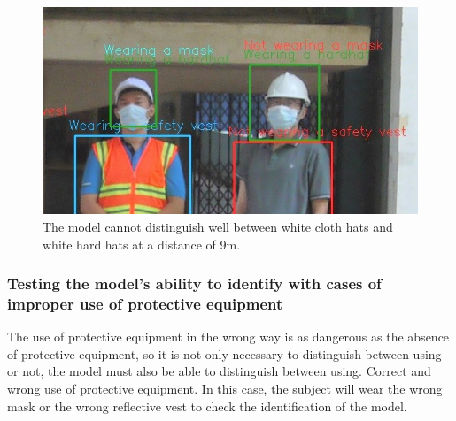\documentclass[conference]{IEEEtran}
\begin{document}
\begin{figure}[ht]
	\centerline{\includegraphics[scale=0.4]{images/bad_hh_9m_zoom.jpg}}
  	\caption{The model cannot distinguish well between white cloth hats and white hard hats at a distance of 9m.}
  	\label{fig:good_hh_9m_zoom}
\end{figure}

\subsubsection{Testing the model's ability to identify with cases of improper use of protective equipment}
The use of protective equipment in the wrong way is as dangerous as the absence of protective equipment, so it is not only necessary to distinguish between using or not, the model must also be able to distinguish between using. Correct and wrong use of protective equipment. In this case, the subject will wear the wrong mask or the wrong reflective vest to check the identification of the model.
\end{document}
